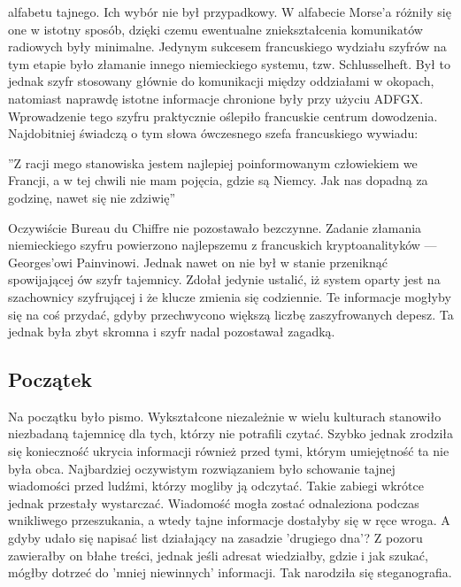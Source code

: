 \documentclass[10pt, letterpaper, titlepage]{article}
\begin{document}
alfabetu tajnego. Ich wybór nie był przypadkowy. W alfabecie Morse’a różniły się one w istotny sposób, dzięki czemu ewentualne zniekształcenia komunikatów radiowych były minimalne. Jedynym
sukcesem francuskiego wydziału szyfrów na tym etapie było złamanie innego niemieckiego systemu, tzw. Schlusselheft. Był to jednak szyfr stosowany głównie do komunikacji między oddziałami
w okopach, natomiast naprawdę istotne informacje chronione były przy użyciu ADFGX. Wprowadzenie tego szyfru praktycznie oślepiło francuskie centrum dowodzenia. Najdobitniej świadczą o
tym słowa ówczesnego szefa francuskiego wywiadu:
\\
\begin{center}
”Z racji mego stanowiska jestem najlepiej poinformowanym człowiekiem we Francji, a w tej chwili nie mam pojęcia, gdzie są Niemcy. Jak nas dopadną za godzinę, nawet się nie zdziwię”\cite{latexdps}
\end{center}
Oczywiście Bureau du Chiffre nie pozostawało bezczynne. Zadanie złamania niemieckiego szyfru
powierzono najlepszemu z francuskich kryptoanalityków — Georges’owi Painvinowi. Jednak nawet
on nie był w stanie przeniknąć spowijającej ów szyfr tajemnicy. Zdołał jedynie ustalić, iż system
oparty jest na szachownicy szyfrującej i że klucze zmienia się codziennie. Te informacje mogłyby się
na coś przydać, gdyby przechwycono większą liczbę zaszyfrowanych depesz. Ta jednak była zbyt
skromna i szyfr nadal pozostawał zagadką.
\subsection{Początek}
Na początku było pismo. Wykształcone niezależnie w wielu kulturach stanowiło niezbadaną tajemnicę dla tych, którzy nie potrafili czytać. Szybko jednak zrodziła się konieczność ukrycia informacji
również przed tymi, którym umiejętność ta nie była obca. Najbardziej oczywistym rozwiązaniem
było schowanie tajnej wiadomości przed ludźmi, którzy mogliby ją odczytać. Takie zabiegi wkrótce
jednak przestały wystarczać. Wiadomość mogła zostać odnaleziona podczas wnikliwego przeszukania, a wtedy tajne informacje dostałyby się w ręce wroga. A gdyby udało się napisać list działający
na zasadzie ’drugiego dna’? Z pozoru zawierałby on błahe treści, jednak jeśli adresat wiedziałby,
gdzie i jak szukać, mógłby dotrzeć do ’mniej niewinnych’ informacji. Tak narodziła się steganografia.
\end{document}
